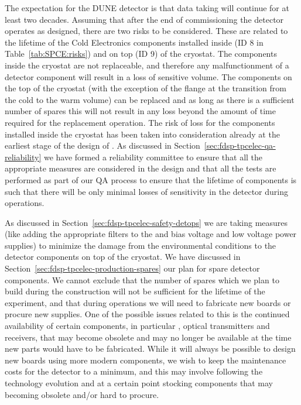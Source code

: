 The expectation for the DUNE detector is that data taking will continue
for at least two decades. Assuming that after the end of commissioning the
detector operates as designed, there are two risks to be considered.
These are related to the lifetime of the Cold Electronics components
installed inside (ID 8 in Table~\ref{tab:SPCE:risks}) and on top (ID 9)
of the cryostat. The components inside the cryostat are not replaceable,
and therefore any malfunctionment of a detector component will result in
a loss of sensitive volume. The components on the top of the cryostat
(with the exception of the flange at the transition from the cold to
the warm volume) can be replaced and as long as there is a sufficient
number of spares this will not result in any loss beyond the amount 
of time required for the replacement operation. The risk of loss for
the components installed inside the cryostat has been taken into consideration
already at the earliest stage of the design of . As discussed
in Section~\ref{sec:fdsp-tpcelec-qa-reliability} we have formed a 
reliability committee to ensure that all the appropriate measures
are considered in the design and that all the tests are performed
as part of our QA process to ensure that the lifetime of components is
such that there will be only minimal losses of sensitivity in the 
detector during operations. 

As discussed in Section~\ref{sec:fdsp-tpcelec-safety-detops} we
are taking measures (like adding the appropriate filters to the
 and bias voltage and low voltage power supplies) to
minimize the damage from the environmental conditions to the 
detector components on top of the cryostat. We have discussed in
Section~\ref{sec:fdsp-tpcelec-production-spares} our plan for 
spare detector components. We cannot exclude that the number of
spares which we plan to build during the construction will not be
sufficient for the lifetime of the experiment, and that during 
operations we will need to fabricate new boards or procure new
supplies. One of the possible issues related to this is the 
continued availability of certain components, in particular
, optical transmitters and receivers, that may 
become obsolete and may no longer be available at the time new
parts would have to be fabricated. While it will always be 
possible to design new boards using more modern components, we
wish to keep the maintenance costs for the detector to a minimum,
and this may involve following the technology evolution and at
a certain point stocking components that may becoming obsolete
and/or hard to procure.
